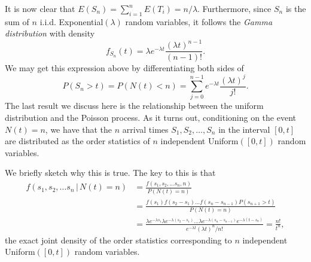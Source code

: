 \documentclass[11pt]{article}
\newcommand{\where}{\,|\,}
\begin{document}
It is now clear that $E(S_{n})=\sum_{i=1}^{n}E(T_{i})=n/\lambda $. Furthermore, since $S_{n}$ is the sum of $n$ i.i.d. Exponential$(\lambda)$ random variables, it follows the \textit{Gamma distribution} with density
\[
f_{S_{n}}(t)=\lambda e^{- \lambda t}\frac{(\lambda t)^{n- 1}}{(n-1)!}.
\]
We may get this expression above by differentiating both sides of
\[
P(S_{n}>t)=P(N(t)<n)=\sum_{j=0}^{n- 1}e^{- \lambda t}\frac{(\lambda t)^{j}}{j!}.
\]
The last result we discuss here is the relationship between the uniform distribution and the Poisson process. As it turns out, conditioning on the event $N(t)=n$, we have that the $n$ arrival times $S_{1},S_{2},\dots ,S_{n}$ in the interval $[0,t]$ are distributed as the order statistics of $n$ independent Uniform$([0,t])$ random variables.

We briefly sketch why this is true. The key to this is that
\begin{align*}
f(s_{1},s_{2},\dots s_{n} \where N (t)=n) & =\frac{f(s_{1},s_{2},\dots s_{n},n)}{P(N(t)=n)} \\ & = \frac{f(s_{1})f(s_{2}- s_{1})\dots f(s_{n}- s_{n-1})P(s_{n+1}>t)}{P(N(t)=n)} \\
& =\frac{\lambda e^{- \lambda s_{1}}\lambda e^{- \lambda (s_{2}- s_{1})}\dots \lambda e^{- \lambda (s_{n}- s_{n- 1})}e^{- \lambda (t- s_{n})}}{e^{- \lambda t}(\lambda t)^{n}/n!}
=\frac{n!}{t^{n}},
\end{align*}
the exact joint density of the order statistics corresponding to $n$ independent 
Uniform$([0,t])$ random variables.
\end{document}
